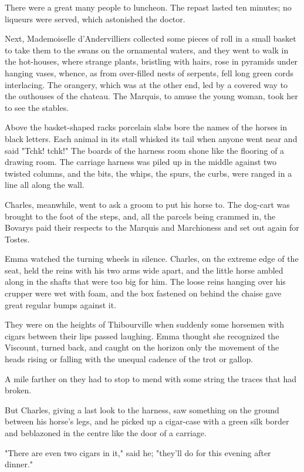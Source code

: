 \documentclass[11pt,twocolumn]{ltugboat}
\begin{document}
There were a great many people to luncheon. The repast lasted ten
minutes; no liqueurs were served, which astonished the doctor.

Next, Mademoiselle d'Andervilliers collected some pieces of roll in a
small basket to take them to the swans on the ornamental waters, and
they went to walk in the hot-houses, where strange plants, bristling
with hairs, rose in pyramids under hanging vases, whence, as from
over-filled nests of serpents, fell long green cords interlacing.
The orangery, which was at the other end, led by a covered way to the
outhouses of the chateau. The Marquis, to amuse the young woman, took
her to see the stables.

Above the basket-shaped racks porcelain slabs bore the names of the
horses in black letters. Each animal in its stall whisked its tail when
anyone went near and said "Tchk! tchk!" The boards of the harness room
shone like the flooring of a drawing room. The carriage harness was
piled up in the middle against two twisted columns, and the bits, the
whips, the spurs, the curbs, were ranged in a line all along the wall.

Charles, meanwhile, went to ask a groom to put his horse to. The
dog-cart was brought to the foot of the steps, and, all the parcels
being crammed in, the Bovarys paid their respects to the Marquis and
Marchioness and set out again for Tostes.

Emma watched the turning wheels in silence. Charles, on the extreme edge
of the seat, held the reins with his two arms wide apart, and the little
horse ambled along in the shafts that were too big for him. The loose
reins hanging over his crupper were wet with foam, and the box fastened
on behind the chaise gave great regular bumps against it.

They were on the heights of Thibourville when suddenly some horsemen
with cigars between their lips passed laughing. Emma thought she
recognized the Viscount, turned back, and caught on the horizon only the
movement of the heads rising or falling with the unequal cadence of the
trot or gallop.

A mile farther on they had to stop to mend with some string the traces
that had broken.

But Charles, giving a last look to the harness, saw something on the
ground between his horse's legs, and he picked up a cigar-case with
a green silk border and beblazoned in the centre like the door of a
carriage.

"There are even two cigars in it," said he; "they'll do for this evening
after dinner."
\end{document}
